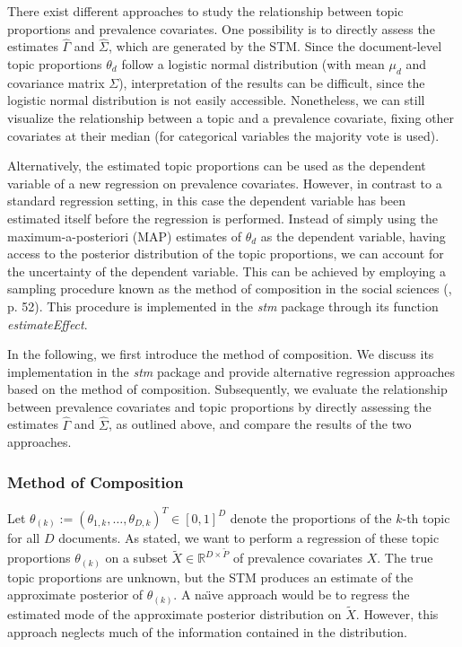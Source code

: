 There exist different approaches to study the relationship between topic proportions and prevalence covariates. One possibility is to directly assess the estimates $\hat{\Gamma}$ and $\hat{\Sigma}$, which are generated by the STM. Since the document-level topic proportions $\theta_d$ follow a logistic normal distribution (with mean $\mu_d$ and covariance matrix $\Sigma$), interpretation of the results can be difficult, since the logistic normal distribution is not easily accessible. Nonetheless, we can still visualize the relationship between a topic and a prevalence covariate, fixing other covariates at their median (for categorical variables the majority vote is used).

Alternatively, the estimated topic proportions can be used as the dependent variable of a new regression on prevalence covariates. However, in contrast to a standard regression setting, in this case the dependent variable has been estimated itself before the regression is performed. Instead of simply using the maximum-a-posteriori (MAP) estimates of $\theta_d$ as the dependent variable, having access to the posterior distribution of the topic proportions, we can account for the uncertainty of the dependent variable. This can be achieved by employing a sampling procedure known as the method of composition in the social sciences  (\citealp{tanner2012tools}, p. 52). This procedure is implemented in the \textit{stm} package through its function \textit{estimateEffect}.

In the following, we first introduce the method of composition. We discuss its implementation in the \textit{stm} package and provide alternative regression approaches based on the method of composition. Subsequently, we evaluate the relationship between prevalence covariates and topic proportions by directly assessing the estimates $\hat{\Gamma}$ and $\hat{\Sigma}$, as outlined above, and compare the results of the two approaches.

\subsubsection{Method of Composition}

Let $\theta_{(k)}:=(\theta_{1,k}, \dots, \theta_{D,k})^T \in [0,1]^{D}$ denote the proportions of the $k$-th topic for all $D$ documents. As stated, we want to perform a regression of these topic proportions $\theta_{(k)}$ on a subset $\tilde{X} \in \mathbb{R}^{D \times \tilde{P}}$ of prevalence covariates $X$. The true topic proportions are unknown, but the STM produces an estimate of the approximate posterior of $\theta_{(k)}$. A na{\"\i}ve approach would be to regress the estimated mode of the approximate posterior distribution on $\tilde{X}$. However, this approach neglects much of the information contained in the distribution. 

